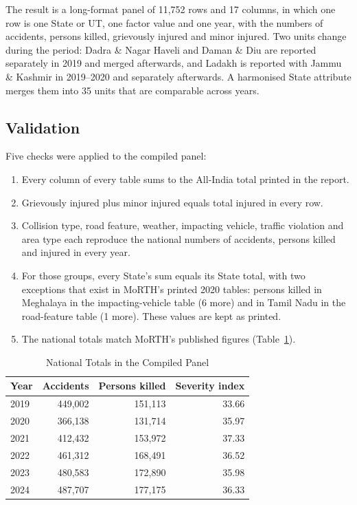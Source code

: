 \documentclass[conference]{IEEEtran}
\begin{document}
The result is a long-format panel of 11,752 rows and 17 columns, in which one row is one State or UT, one factor value and one year, with the numbers of accidents, persons killed, grievously injured and minor injured. Two units change during the period: Dadra \& Nagar Haveli and Daman \& Diu are reported separately in 2019 and merged afterwards, and Ladakh is reported with Jammu \& Kashmir in 2019--2020 and separately afterwards. A harmonised State attribute merges them into 35 units that are comparable across years.

\subsection{Validation}
Five checks were applied to the compiled panel:
\begin{enumerate}
\item Every column of every table sums to the All-India total printed in the report.
\item Grievously injured plus minor injured equals total injured in every row.
\item Collision type, road feature, weather, impacting vehicle, traffic violation and area type each reproduce the national numbers of accidents, persons killed and injured in every year.
\item For those groups, every State's sum equals its State total, with two exceptions that exist in MoRTH's printed 2020 tables: persons killed in Meghalaya in the impacting-vehicle table (6 more) and in Tamil Nadu in the road-feature table (1 more). These values are kept as printed.
\item The national totals match MoRTH's published figures (Table~\ref{tab:national}).
\end{enumerate}

\begin{table}[t]
\caption{National Totals in the Compiled Panel}
\label{tab:national}
\centering
\footnotesize
\begin{tabular}{@{}lrrr@{}}
\toprule
Year & Accidents & Persons killed & Severity index \\
\midrule
2019 & 449,002 & 151,113 & 33.66 \\
2020 & 366,138 & 131,714 & 35.97 \\
2021 & 412,432 & 153,972 & 37.33 \\
2022 & 461,312 & 168,491 & 36.52 \\
2023 & 480,583 & 172,890 & 35.98 \\
2024 & 487,707 & 177,175 & 36.33 \\
\bottomrule
\end{tabular}
\end{table}
\end{document}
